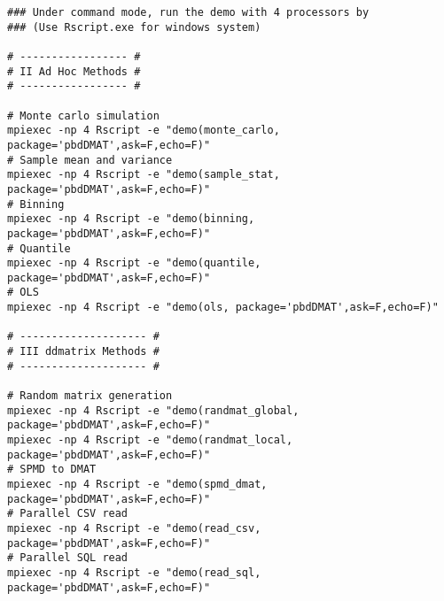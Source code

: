 \begin{lstlisting}[title=Shell Script]
### Under command mode, run the demo with 4 processors by
### (Use Rscript.exe for windows system)

# ----------------- #
# II Ad Hoc Methods #
# ----------------- #

# Monte carlo simulation
mpiexec -np 4 Rscript -e "demo(monte_carlo, package='pbdDMAT',ask=F,echo=F)"
# Sample mean and variance
mpiexec -np 4 Rscript -e "demo(sample_stat, package='pbdDMAT',ask=F,echo=F)"
# Binning
mpiexec -np 4 Rscript -e "demo(binning, package='pbdDMAT',ask=F,echo=F)"
# Quantile
mpiexec -np 4 Rscript -e "demo(quantile, package='pbdDMAT',ask=F,echo=F)"
# OLS
mpiexec -np 4 Rscript -e "demo(ols, package='pbdDMAT',ask=F,echo=F)"

# -------------------- #
# III ddmatrix Methods #
# -------------------- #

# Random matrix generation
mpiexec -np 4 Rscript -e "demo(randmat_global, package='pbdDMAT',ask=F,echo=F)"
mpiexec -np 4 Rscript -e "demo(randmat_local, package='pbdDMAT',ask=F,echo=F)"
# SPMD to DMAT
mpiexec -np 4 Rscript -e "demo(spmd_dmat, package='pbdDMAT',ask=F,echo=F)"
# Parallel CSV read
mpiexec -np 4 Rscript -e "demo(read_csv, package='pbdDMAT',ask=F,echo=F)"
# Parallel SQL read
mpiexec -np 4 Rscript -e "demo(read_sql, package='pbdDMAT',ask=F,echo=F)"
\end{lstlisting}